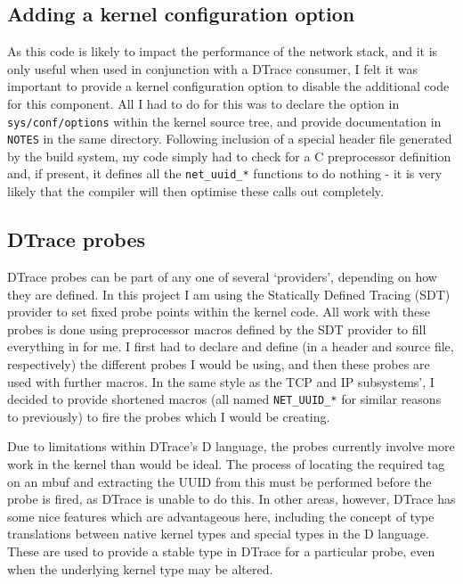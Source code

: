 \documentclass[a4paper,12pt,twoside,openright]{report}
\begin{document}
	\subsection{Adding a kernel configuration option}
	
	As this code is likely to impact the performance of the network stack, and it is only useful when used in conjunction with a DTrace consumer, I felt it was important to provide a kernel configuration option to disable the additional code for this component. All I had to do for this was to declare the option in \verb|sys/conf/options| within the kernel source tree, and provide documentation in \verb|NOTES| in the same directory. Following inclusion of a special header file generated by the build system, my code simply had to check for a C preprocessor definition and, if present, it defines all the \verb|net_uuid_*| functions to do nothing - it is very likely that the compiler will then optimise these calls out completely.
	
	\subsection{DTrace probes}
	
	DTrace probes can be part of any one of several `providers', depending on how they are defined. In this project I am using the Statically Defined Tracing (SDT) provider to set fixed probe points within the kernel code. All work with these probes is done using preprocessor macros defined by the SDT provider to fill everything in for me. I first had to declare and define (in a header and source file, respectively) the different probes I would be using, and then these probes are used with further macros. In the same style as the TCP and IP subsystems', I decided to provide shortened macros (all named \verb|NET_UUID_*| for similar reasons to previously) to fire the probes which I would be creating.
	
	Due to limitations within DTrace's D language, the probes currently involve more work in the kernel than would be ideal. The process of locating the required tag on an mbuf and extracting the UUID from this must be performed before the probe is fired, as DTrace is unable to do this. In other areas, however, DTrace has some nice features which are advantageous here, including the concept of type translations between native kernel types and special types in the D language. These are used to provide a stable type in DTrace for a particular probe, even when the underlying kernel type may be altered.
	
\end{document}
